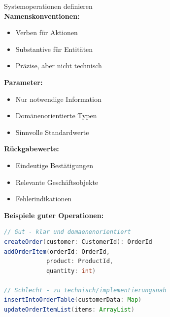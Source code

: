 \begin{KR}{Systemoperationen definieren}\\
\textbf{Namenskonventionen:}
\begin{itemize}
    \item Verben für Aktionen
    \item Substantive für Entitäten
    \item Präzise, aber nicht technisch
\end{itemize}

\textbf{Parameter:}
\begin{itemize}
    \item Nur notwendige Information
    \item Domänenorientierte Typen
    \item Sinnvolle Standardwerte
\end{itemize}

\textbf{Rückgabewerte:}
\begin{itemize}
    \item Eindeutige Bestätigungen
    \item Relevante Geschäftsobjekte
    \item Fehlerindikationen
\end{itemize}

\textbf{Beispiele guter Operationen:}
\begin{lstlisting}[language=Java, style=base]
// Gut - klar und domaenenorientiert
createOrder(customer: CustomerId): OrderId
addOrderItem(orderId: OrderId, 
            product: ProductId, 
            quantity: int)

// Schlecht - zu technisch/implementierungsnah
insertIntoOrderTable(customerData: Map)
updateOrderItemList(items: ArrayList)
\end{lstlisting}
\end{KR}

